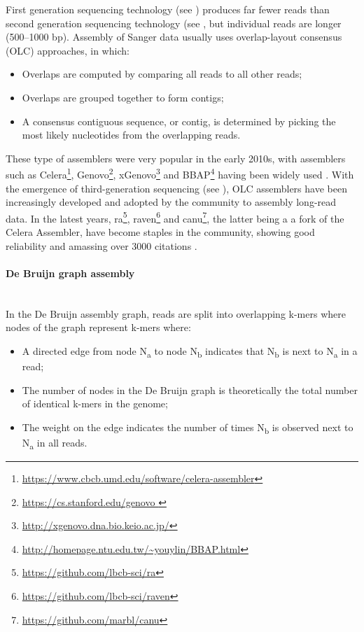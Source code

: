 First generation sequencing technology (see ) produces far fewer reads than second generation sequencing technology (see , but individual reads are longer (500–1000 bp). 
Assembly of Sanger data usually uses overlap-layout consensus (OLC) approaches, in which:

\begin{itemize}
    \item Overlaps are computed by comparing all reads to all other reads;
    \item Overlaps are grouped together to form contigs;
    \item A consensus contiguous sequence, or contig, is determined by picking the most likely nucleotides from the overlapping reads.
\end{itemize}

These type of assemblers were very popular in the early 2010s, with assemblers such as Celera\footnote{\url{https://www.cbcb.umd.edu/software/celera-assembler}},  Genovo\footnote{\url{https://cs.stanford.edu/genovo }}, xGenovo\footnote{\url{http://xgenovo.dna.bio.keio.ac.jp/}} and BBAP\footnote{\url{http://homepage.ntu.edu.tw/~youylin/BBAP.html}} having been widely used \citep{myers_whole-genome_2000, hutchison_genovo_2010, afiahayati_extended_2013, lin_novo_2017}.
With the emergence of third-generation sequencing (see ), OLC assemblers have been increasingly developed and adopted by the community to assembly long-read data. 
In the latest years, ra\footnote{\url{https://github.com/lbcb-sci/ra}}, raven\footnote{\url{https://github.com/lbcb-sci/raven}} and canu\footnote{\url{https://github.com/marbl/canu}}, the latter being a a fork of the Celera Assembler, have become staples in the community, showing good reliability and amassing over 3000 citations \citep{vaser_yet_2019, koren_canu_2017, wick_benchmarking_2021}.  %

\paragraph{De Bruijn graph assembly} \label{sssec:_intro_dbg_assembly} \mbox{}\\

In the De Bruijn assembly graph, reads are split into overlapping k-mers where nodes of the graph represent k-mers where:

\begin{itemize}
    \item A directed edge from node N\textsubscript{a} to node N\textsubscript{b} indicates that N\textsubscript{b} is next to N\textsubscript{a} in a read;
    \item The number of nodes in the De Bruijn graph is theoretically the total number of identical k-mers in the genome;
    \item The weight on the edge indicates the number of times  N\textsubscript{b} is observed next to  N\textsubscript{a} in all reads.
\end{itemize}


